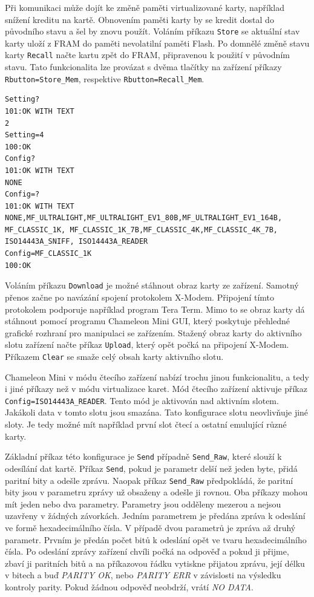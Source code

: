 Při komunikaci může dojít ke změně paměti virtualizované karty, například snížení kreditu na kartě. Obnovením paměti karty by se kredit dostal do původního stavu a šel by znovu použít. Voláním příkazu \verb|Store| se aktuální stav karty uloží z FRAM do paměti nevolatilní paměti Flash. Po domnělé změně stavu karty \verb|Recall| načte kartu zpět do FRAM, připravenou k použití v původním stavu. Tato funkcionalita lze provázat s dvěma tlačítky na zařízení příkazy \verb|Rbutton=Store_Mem|, respektive \verb|Rbutton=Recall_Mem|.\par

\begin{lstlisting}[caption=Záznam komunikace se zařízením Chameleon Mini, label={komunikaceChameleon}]
Setting?
101:OK WITH TEXT
2
Setting=4
100:OK
Config?
101:OK WITH TEXT
NONE
Config=?
101:OK WITH TEXT
NONE,MF_ULTRALIGHT,MF_ULTRALIGHT_EV1_80B,MF_ULTRALIGHT_EV1_164B, 
MF_CLASSIC_1K, MF_CLASSIC_1K_7B,MF_CLASSIC_4K,MF_CLASSIC_4K_7B,
ISO14443A_SNIFF, ISO14443A_READER
Config=MF_CLASSIC_1K
100:OK
\end{lstlisting}
Voláním příkazu \verb|Download| je možné stáhnout obraz karty ze zařízení. Samotný přenos začne po navázání spojení protokolem {X-Modem}. Připojení tímto protokolem podporuje například program Tera Term. Mimo to se obraz karty dá stáhnout pomocí programu Chameleon Mini GUI\footnotemark, který poskytuje přehledné grafické rozhraní pro manipulaci se zařízením. Stažený obraz karty do aktivního slotu zařízení načte příkaz \verb|Upload|, který opět počká na připojení {X-Modem}. Příkazem \verb|Clear| se smaže celý obsah karty aktivního slotu.\par
{}
Chameleon Mini v módu čtecího zařízení nabízí trochu jinou funkcionalitu, a tedy i jiné příkazy než v módu virtualizace karet. Mód čtecího zařízení aktivuje příkaz \\\verb|Config=ISO14443A_READER|. Tento mód je aktivován nad aktivním slotem. Jakákoli data v tomto slotu jsou smazána. Tato konfigurace slotu neovlivňuje jiné sloty. Je tedy možné mít například první slot čtecí a ostatní emulující různé karty. \par
Základní příkaz této konfigurace je \verb|Send| případně \verb|Send_Raw|, které slouží k odesílání dat kartě. Příkaz \verb|Send|, pokud je parametr delší než jeden byte, přidá paritní bity a odešle zprávu. Naopak příkaz \verb|Send_Raw| předpokládá, že paritní bity jsou v parametru zprávy už obsaženy a odešle ji rovnou. Oba příkazy mohou mít jeden nebo dva parametry. Parametry jsou odděleny mezerou a nejsou uzavřeny v žádných závorkách. Jedním parametrem je předána zpráva k odeslání ve formě hexadecimálního čísla. V případě dvou parametrů je zpráva až druhý parametr. Prvním je předán počet bitů k odeslání opět ve tvaru hexadecimálního čísla. Po odeslání zprávy zařízení chvíli počká na odpověď a pokud ji přijme, zbaví ji paritních bitů a na příkazovou řádku vytiskne přijatou zprávu, její délku v bitech a buď \emph{PARITY OK}, nebo \emph{PARITY ERR} v závislosti na výsledku kontroly parity. Pokud žádnou odpověď neobdrží, vrátí \emph{NO DATA}.\par
